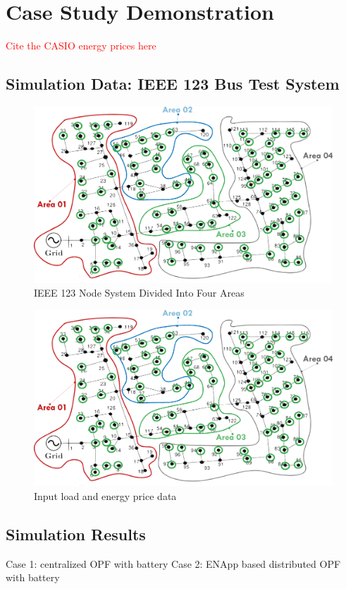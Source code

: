 \documentclass[../../outputs/main.tex]{subfiles}
\begin{document}
\section{Case Study Demonstration}

\textcolor{red}{Cite the CASIO energy prices here}
\subsection{Simulation Data: IEEE 123 Bus Test System}

\begin{figure}[h!]
    \centering
    \includegraphics[width=\linewidth]{../figures/ieee123-FourAreas.png}
    \caption{IEEE 123 Node System Divided Into Four Areas}
    \label{fig:ieee123-four-area-figure}
\end{figure}


\begin{figure}[h!]
    \centering
    \includegraphics[width=\linewidth]{../figures/ieee123-FourAreas.png}
    \caption{Input load and energy price data}
    \label{fig:input_data}
\end{figure}



\subsection{Simulation Results}
Case 1: centralized OPF with battery
Case 2: ENApp based distributed OPF with battery
\end{document}
